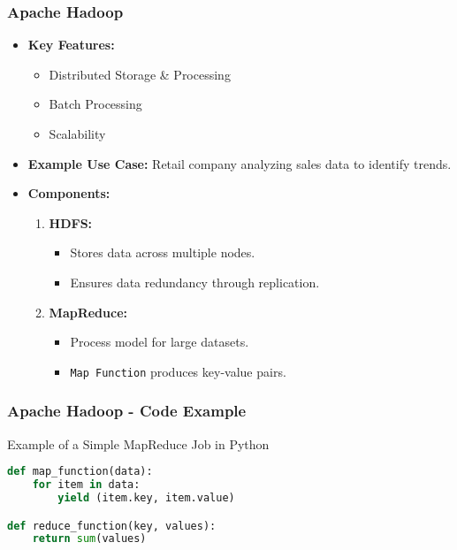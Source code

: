 \documentclass[aspectratio=169]{beamer}
\begin{document}
\begin{frame}[fragile]
  \frametitle{Apache Hadoop}
  \begin{itemize}
    \item \textbf{Key Features:}
      \begin{itemize}
        \item Distributed Storage \& Processing
        \item Batch Processing
        \item Scalability
      \end{itemize}
      
    \item \textbf{Example Use Case:} 
      Retail company analyzing sales data to identify trends.
      
    \item \textbf{Components:}
      \begin{enumerate}
        \item \textbf{HDFS:}
          \begin{itemize}
            \item Stores data across multiple nodes.
            \item Ensures data redundancy through replication.
          \end{itemize}
        \item \textbf{MapReduce:}
          \begin{itemize}
            \item Process model for large datasets.
            \item \texttt{Map Function} produces key-value pairs.
          \end{itemize}
      \end{enumerate}
  \end{itemize}
\end{frame}

\begin{frame}[fragile]
  \frametitle{Apache Hadoop - Code Example}
  \begin{block}{Example of a Simple MapReduce Job in Python}
  \begin{lstlisting}[language=Python]
def map_function(data):
    for item in data:
        yield (item.key, item.value)

def reduce_function(key, values):
    return sum(values)
  \end{lstlisting}
  \end{block}
\end{frame}
\end{document}
